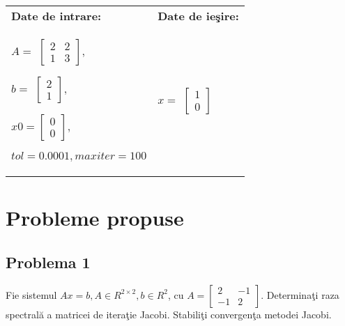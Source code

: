 \documentclass{exam}
\begin{document}
\begin{center}
	\begin{tabular}{| l | l |}
		\hline
		\textbf{Date de intrare:}  & \textbf{Date de ieşire:} \\
		$A = $
		$\left[ {\begin{array}{cc}
							         2 & 2 \\
							         1 & 3
						         \end{array} } \right],$

		$b = $
		$\left[ {\begin{array}{cc}
							         2 \\
							         1
						         \end{array} } \right],$

		$x0 =
			\left[ {\begin{array}{cc}
							        0 \\
							        0
						        \end{array} } \right],$

		$ tol=0.0001, maxiter=100$ &
		$x = $
		$\left[ {\begin{array}{cc}
							         1 \\
							         0
						         \end{array} } \right]$
		\\
		\hline
	\end{tabular}
\end{center}

\section{Probleme propuse}

\subsection{Problema 1}
Fie sistemul $Ax=b, A \in R^{2 \times 2}, b \in R^{2}$, cu
$A =\left[ {\begin{array}{cc}
					2  & -1 \\
					-1 & 2
				\end{array} } \right]$. Determina\c{t}i raza spectral\u{a} a matricei de itera\c{t}ie Jacobi. Stabili\c{t}i convergen\c{t}a metodei Jacobi.
\end{document}
